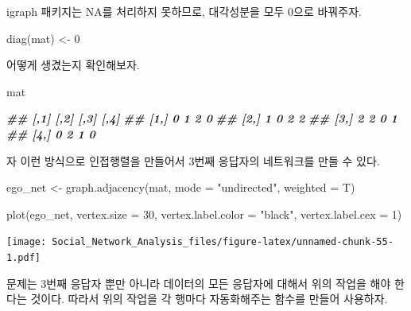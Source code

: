 \documentclass[
]{book}
\newenvironment{Shaded}{\begin{snugshade}}{\end{snugshade}}
\newcommand{\AttributeTok}[1]{\textcolor[rgb]{0.77,0.63,0.00}{#1}}
\newcommand{\DecValTok}[1]{\textcolor[rgb]{0.00,0.00,0.81}{#1}}
\newcommand{\DocumentationTok}[1]{\textcolor[rgb]{0.56,0.35,0.01}{\textbf{\textit{#1}}}}
\newcommand{\FunctionTok}[1]{\textcolor[rgb]{0.00,0.00,0.00}{#1}}
\newcommand{\NormalTok}[1]{#1}
\newcommand{\OtherTok}[1]{\textcolor[rgb]{0.56,0.35,0.01}{#1}}
\newcommand{\StringTok}[1]{\textcolor[rgb]{0.31,0.60,0.02}{#1}}
\begin{document}
igraph 패키지는 NA를 처리하지 못하므로, 대각성분을 모두 0으로 바꿔주자.

\begin{Shaded}
\begin{Highlighting}[]
\FunctionTok{diag}\NormalTok{(mat) }\OtherTok{\textless{}{-}} \DecValTok{0}
\end{Highlighting}
\end{Shaded}

어떻게 생겼는지 확인해보자.

\begin{Shaded}
\begin{Highlighting}[]
\NormalTok{mat}
\end{Highlighting}
\end{Shaded}

\begin{Shaded}
\begin{Highlighting}[]
\DocumentationTok{\#\#      [,1] [,2] [,3] [,4]}
\DocumentationTok{\#\# [1,]    0    1    2    0}
\DocumentationTok{\#\# [2,]    1    0    2    2}
\DocumentationTok{\#\# [3,]    2    2    0    1}
\DocumentationTok{\#\# [4,]    0    2    1    0}
\end{Highlighting}
\end{Shaded}

자 이런 방식으로 인접행렬을 만들어서 3번째 응답자의 네트워크를 만들 수 있다.

\begin{Shaded}
\begin{Highlighting}[]
\NormalTok{ego\_net }\OtherTok{\textless{}{-}} \FunctionTok{graph.adjacency}\NormalTok{(mat, }\AttributeTok{mode =} \StringTok{"undirected"}\NormalTok{, }\AttributeTok{weighted =}\NormalTok{ T)}
\end{Highlighting}
\end{Shaded}

\begin{Shaded}
\begin{Highlighting}[]
\FunctionTok{plot}\NormalTok{(ego\_net, }\AttributeTok{vertex.size =} \DecValTok{30}\NormalTok{, }\AttributeTok{vertex.label.color =} \StringTok{"black"}\NormalTok{, }\AttributeTok{vertex.label.cex =} \DecValTok{1}\NormalTok{)}
\end{Highlighting}
\end{Shaded}

\texttt{[image: Social\_Network\_Analysis\_files/figure-latex/unnamed-chunk-55-1.pdf]}

문제는 3번째 응답자 뿐만 아니라 데이터의 모든 응답자에 대해서 위의 작업을 해야 한다는 것이다.
따라서 위의 작업을 각 행마다 자동화해주는 함수를 만들어 사용하자.
\end{document}
